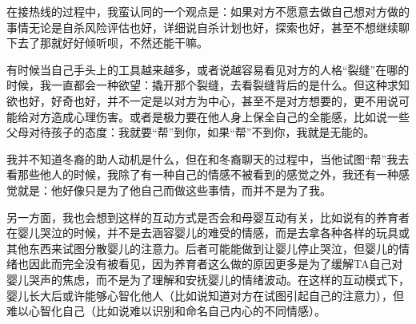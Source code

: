 
在接热线的过程中，我蛮认同的一个观点是：如果对方不愿意去做自己想对方做的事情\pozhehao{}无论是自杀风险评估也好，详细说自杀计划也好，探索也好，甚至不想继续聊下去了\pozhehao{}那就好好倾听呗，不然还能干嘛。

有时候当自己手头上的工具越来越多，或者说越容易看见对方的人格“裂缝”在哪的时候，我一直都会一种欲望：撬开那个裂缝，去看裂缝背后的是什么。但这种求知欲也好，好奇也好，并不一定是以对方为中心，甚至不是对方想要的，更不用说可能给对方造成心理伤害。或者是极力要在他人身上保全自己的全能感，比如说一些父母对待孩子的态度：我就要“帮”到你，如果“帮”不到你，我就是无能的。

我并不知道冬裔的助人动机是什么，但在和冬裔聊天的过程中，当他试图“帮”我去看那些他人的时候，我除了有一种自己的情感不被看到的感觉之外，我还有一种感觉就是：他好像只是为了他自己而做这些事情，而并不是为了我。

另一方面，我也会想到这样的互动方式是否会和母婴互动有关，比如说有的养育者在婴儿哭泣的时候，并不是去涵容婴儿的难受的情感，而是去拿各种各样的玩具或其他东西来试图分散婴儿的注意力。后者可能能做到让婴儿停止哭泣，但婴儿的情绪也因此而完全没有被看见，因为养育者这么做的原因更多是为了缓解TA自己对婴儿哭声的焦虑，而不是为了理解和安抚婴儿的情绪波动。在这样的互动模式下，婴儿长大后或许能够心智化他人（比如说知道对方在试图引起自己的注意力），但难以心智化自己（比如说难以识别和命名自己内心的不同情感）。






